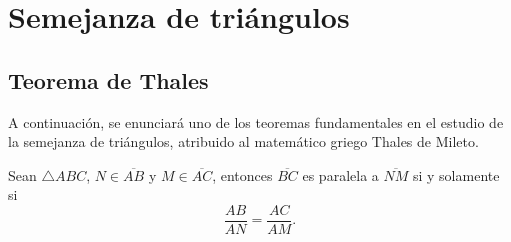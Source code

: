 \chapter{Semejanza de triángulos}

\section{Teorema de Thales}
A continuación, se enunciará uno de los teoremas fundamentales en el estudio de la semejanza de triángulos, atribuido al matemático griego Thales de Mileto. 
\begin{teo}\label{Thales1}
Sean $\triangle ABC$, $N\in\overline{AB}$ y $M\in\overline{AC}$, entonces $\overline{BC}$ es paralela a          
$\overline{NM}$ si y solamente si $$\frac{AB}{AN}=\frac{AC}{AM}.$$
\end{teo}
